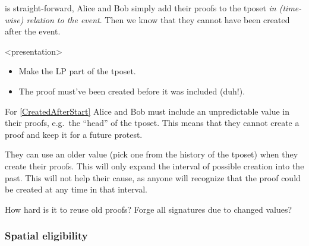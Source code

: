  is straight-forward, Alice and Bob simply add their 
proofs to the \ac{tposet} \emph{in (time-wise) relation to the event}.
Then we know that they cannot have been created after the event.

\begin{frame}<presentation>
  \begin{solution}
    \begin{itemize}
      \item Make the \ac{LP} part of the \ac{tposet}.
      \item The proof must've been created before it was included (duh!).
    \end{itemize}
  \end{solution}
\end{frame}

For \cref{CreatedAfterStart} Alice and Bob must include an unpredictable value 
in their proofs, e.g.\ the \enquote{head} of the \ac{tposet}.
This means that they cannot create a proof and keep it for a future protest.

They can use an older value (pick one from the history of the \ac{tposet}) when 
they create their proofs.
This will only expand the interval of possible creation into the past.
This will not help their cause, as anyone will recognize that the proof could 
be created at any time in that interval.

\begin{frame}

  \pause

  \begin{question}
    How hard is it to reuse old proofs?
    Forge all signatures due to changed values?
  \end{question}
\end{frame}

\subsubsection{Spatial eligibility}

